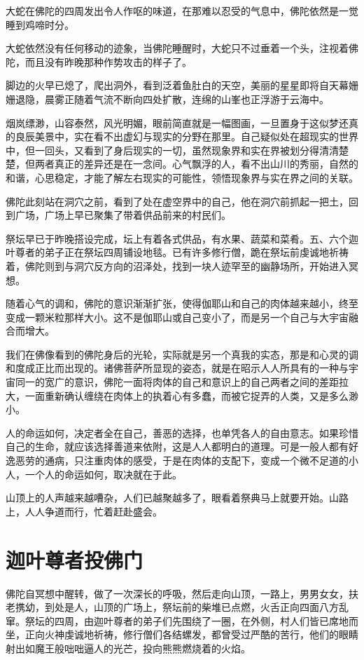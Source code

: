 \documentclass[twoside,openany]{book}
\begin{document}
大蛇在佛陀的四周发出令人作呕的味道，在那难以忍受的气息中，佛陀依然是一觉睡到鸡啼时分。

大蛇依然没有任何移动的迹象，当佛陀睡醒时，大蛇只不过垂着一个头，注视着佛陀，而且没有昨晚那种作势攻击的样子了。

脚边的火早已熄了，爬出洞外，看到泛着鱼肚白的天空，美丽的星星即将自天幕姗姗退隐，晨雾正随着气流不断向四处扩散，连绵的山峯也正浮游于云海中。

烟岚缥渺，山容泰然，风光明媚，眼前简直就是一幅图画，一旦置身于这似梦还真的良辰美景中，实在看不出虚幻与现实的分野在那里。自己疑似处在超现实的世界中，但一回头，又看到了身后现实的一切，虽然现象界和实在界被划分得清清楚楚，但两者真正的差异还是在一念间。心气飘浮的人，看不出山川的秀丽，自然的和谐，心思稳定，才能了解左右现实的可能性，领悟现象界与实在界之间的关联。

佛陀此刻站在洞穴之前，看到了处在虚空界中的自己，他在洞穴前抓起一把土，回到广场，广场上早已聚集了带着供品前来的村民们。

祭坛早已于昨晚搭设完成，坛上有着各式供品，有水果、蔬菜和菜肴。五、六个迦叶尊者的弟子正在祭坛四周铺设地毯。已有许多修行僧，跪在祭坛前虔诚地祈祷着，佛陀则到与洞穴反方向的沼泽处，找到一块人迹罕至的幽静场所，开始进入冥想。

随着心气的调和，佛陀的意识渐渐扩张，使得伽耶山和自己的肉体越来越小，终至变成一颗米粒那样大小。这不是伽耶山或自己变小了，而是另一个自己与大宇宙融合而增大。

我们在佛像看到的佛陀身后的光轮，实际就是另一个真我的实态，那是和心灵的调和度成正比而出现的。诸佛菩萨所显现的姿态，就是在昭示人人所具有的一种与宇宙同一的宽广的意识，佛陀一面将肉体的自己和意识上的自己两者之间的差距拉大，一面重新确认缠绕在肉体上的执着心有多蠢，而被它捉弄的人类，又是多么渺小。

人的命运如何，决定者全在自己，善恶的选择，也单凭各人的自由意志。如果珍惜自己的生命，就应该选择善道来依附，这是人人都明白的道理。可是一般人都有好逸恶劳的通病，只注重肉体的感受，于是在肉体的支配下，变成一个微不足道的小人，一个人的命运如何，取决就在于此。

山顶上的人声越来越嘈杂，人们已越聚越多了，眼看着祭典马上就要开始。山路上，人人争道而行，忙着赶赴盛会。

\section{迦叶尊者投佛门}\label{sec3.5}

佛陀自冥想中醒转，做了一次深长的呼吸，然后走向山顶，一路上，男男女女，扶老携幼，到处是人，山顶的广场上，祭坛前的柴堆已点燃，火舌正向四面八方乱窜。祭坛的四周，由迦叶尊者的弟子们先围绕了一圈，在外侧，村人们皆已席地而坐，正向火神虔诚地祈祷，修行僧们各结螺发，都曾受过严酷的苦行，他们的眼睛射出如魔王般咄咄逼人的光芒，投向熊熊燃烧着的火焰。
\end{document}
